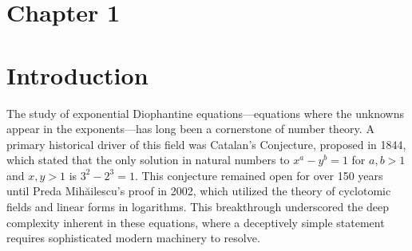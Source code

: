 \documentclass[12pt]{article}
\begin{document}
\newpage
\tableofcontents


\newpage
\listoffigures
\newpage
{}
\begin{center}
    \section*{Chapter 1}
    \section*{Introduction}
\end{center}
\hspace*{0.5cm} The study of exponential Diophantine equations—equations where the unknowns appear in the exponents—has long been a cornerstone of number theory. A primary historical driver of this field was Catalan’s Conjecture, proposed in 1844, which stated that the only solution in natural numbers to $x^a - y^b = 1$ for $a, b > 1$ and $x, y > 1$ is $3^2 - 2^3 = 1$. This conjecture remained open for over 150 years until Preda Mihăilescu’s proof in 2002, which utilized the theory of cyclotomic fields and linear forms in logarithms. This breakthrough underscored the deep complexity inherent in these equations, where a deceptively simple statement requires sophisticated modern machinery to resolve.
\end{document}
